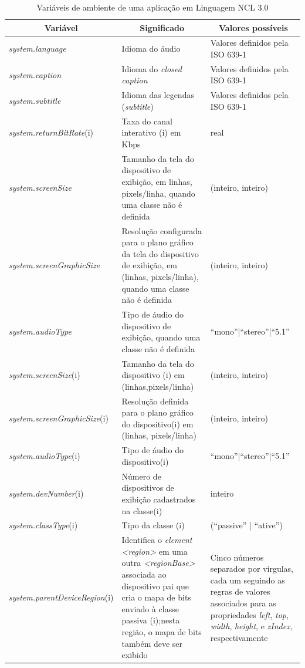 \begin{table}[!ht] \footnotesize
\caption{Variáveis de ambiente de uma aplicação em Linguagem NCL 3.0 
\cite{soares2009programando}}
\label{tab:varAmbSist}
\centering
{
  \renewcommand\arraystretch{0.5}
  \begin{tabular}{|p{4.5cm}|p{6cm}|p{4.2cm}|} \hline
  \multicolumn{1}{|c|}{Variável} & \multicolumn{1}{c|}{Significado} & \multicolumn{1}{c|}{Valores possíveis} \\\hline 

    \textit{system.language} & Idioma do áudio &  Valores definidos pela ISO 639-1 \\\hline
    \textit{system.caption} & Idioma do \textit{closed caption} &  Valores definidos pela ISO 639-1 \\\hline
    \textit{system.subtitle} & Idioma das legendas (\textit{subtitle}) & Valores definidos pela ISO 639-1 \\\hline
    \textit{system.returnBitRate}(i) & Taxa do canal interativo (i) em Kbps & real \\\hline
    \textit{system.screenSize} & Tamanho da tela do dispositivo de exibição, em linhas, pixels/linha, quando uma classe não é definida & (inteiro, inteiro) \\\hline
    \textit{system.screenGraphicSize} & Resolução configurada para o plano gráfico da tela do dispositivo de exibição, em (linhas, pixels/linha), quando uma classe não é definida & (inteiro, inteiro) \\\hline
    \textit{system.audioType} & Tipo de áudio do dispositivo de exibição, quando uma classe não é definida & “mono”|“stereo”|“5.1” \\\hline
    \textit{system.screenSize}(i) & Tamanho da tela do dispositivo (i) em (linhas,pixels/linha) & (inteiro, inteiro) \\\hline
    \textit{system.screenGraphicSize}(i) & Resolução definida para o plano gráfico do dispositivo(i) em (linhas, pixels/linha) & (inteiro, inteiro) \\\hline
    \textit{system.audioType}(i) & Tipo de áudio do dispositivo(i) & “mono”|“stereo”|“5.1” \\\hline
    \textit{system.devNumber}(i) & Número de dispositivos de exibição cadastrados na classe(i) & inteiro \\\hline
    \textit{system.classType}(i) & Tipo da classe (i) & (“passive” | “ative”) \\\hline
    \textit{system.parentDeviceRegion}(i) & Identifica o \textit{element <region>} em uma outra \textit{<regionBase>} associada ao dispositivo pai que cria o mapa de bits enviado à classe         passiva (i);nesta região, o mapa de bits também deve ser exibido & Cinco números separados por vírgulas, cada um seguindo as regras de valores associados        para   as propriedades \textit{left}, \textit{top}, \textit{width}, \textit{height}, e \textit{zIndex}, respectivamente \\\hline

\end{tabular}}
\end{table}
